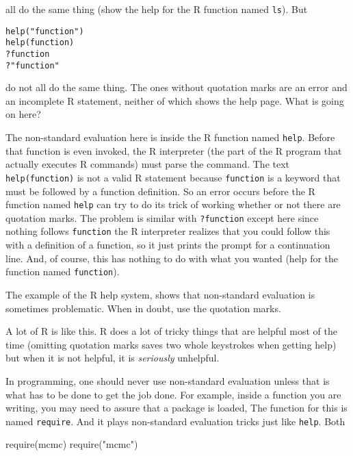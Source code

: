 \documentclass[
]{article}
\newenvironment{Shaded}{\begin{snugshade}}{\end{snugshade}}
\newcommand{\FunctionTok}[1]{\textcolor[rgb]{0.00,0.00,0.00}{#1}}
\newcommand{\NormalTok}[1]{#1}
\newcommand{\StringTok}[1]{\textcolor[rgb]{0.31,0.60,0.02}{#1}}
\begin{document}
all do the same thing (show the help for the R function named
\texttt{ls}). But

\begin{verbatim}
help("function")
help(function)
?function
?"function"
\end{verbatim}

do not all do the same thing. The ones without quotation marks are an
error and an incomplete R statement, neither of which shows the help
page. What is going on here?

The non-standard evaluation here is inside the R function named
\texttt{help}. Before that function is even invoked, the R interpreter
(the part of the R program that actually executes R commands) must parse
the command. The text \texttt{help(function)} is not a valid R statement
because \texttt{function} is a keyword that must be followed by a
function definition. So an error occurs before the R function named
\texttt{help} can try to do its trick of working whether or not there
are quotation marks. The problem is similar with \texttt{?function}
except here since nothing follows \texttt{function} the R interpreter
realizes that you could follow this with a definition of a function, so
it just prints the prompt for a continuation line. And, of course, this
has nothing to do with what you wanted (help for the function named
\texttt{function}).

The example of the R help system, shows that non-standard evaluation is
sometimes problematic. When in doubt, use the quotation marks.

A lot of R is like this. R does a lot of tricky things that are helpful
most of the time (omitting quotation marks saves two whole keystrokes
when getting help) but when it is not helpful, it is \emph{seriously}
unhelpful.

In programming, one should never use non-standard evaluation unless that
is what has to be done to get the job done. For example, inside a
function you are writing, you may need to assure that a package is
loaded, The function for this is named \texttt{require}. And it plays
non-standard evaluation tricks just like \texttt{help}. Both

\begin{Shaded}
\begin{Highlighting}[]
\FunctionTok{require}\NormalTok{(mcmc)}
\FunctionTok{require}\NormalTok{(}\StringTok{"mcmc"}\NormalTok{)}
\end{Highlighting}
\end{Shaded}
\end{document}
